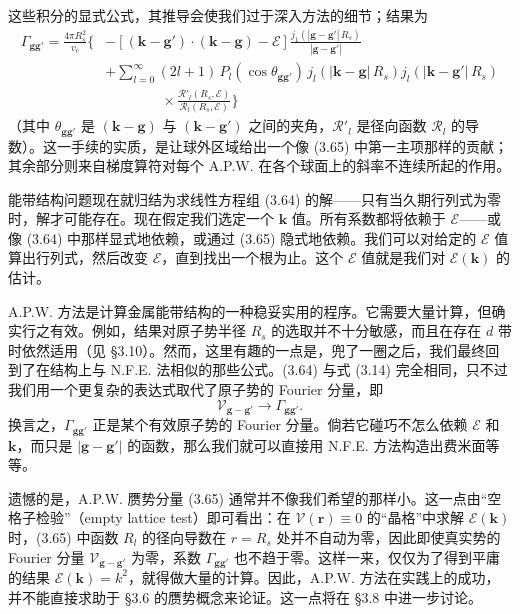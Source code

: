 这些积分的显式公式，其推导会使我们过于深入方法的细节；结果为
\begin{align*}
\Gamma_{\mathbf{gg}'}=\frac{4\pi R_s^2}{v_c}\Big\{&-\left[(\mathbf{k}-\mathbf{g}')\cdot(\mathbf{k}-\mathbf{g})-\mathcal{E}\right]\frac{j_1\left(|\mathbf{g}-\mathbf{g}'|\,R_s\right)}{|\mathbf{g}-\mathbf{g}'|}\\
&+\sum_{l=0}^{\infty}(2l+1)\,P_l(\cos\theta_{\mathbf{gg}'})\,j_l\left(|\mathbf{k}-\mathbf{g}|\,R_s\right)j_l\left(|\mathbf{k}-\mathbf{g}'|\,R_s\right)\\
&\qquad\qquad\times\frac{\mathcal{R}'_l(R_s,\mathcal{E})}{\mathcal{R}_l(R_s,\mathcal{E})}\Big\}\tag{3.65}
\end{align*}
（其中 $\theta_{\mathbf{gg}'}$ 是 $(\mathbf{k}-\mathbf{g})$ 与 $(\mathbf{k}-\mathbf{g}')$ 之间的夹角，$\mathcal{R}'_l$ 是径向函数 $\mathcal{R}_l$ 的导数）。这一手续的实质，是让球外区域给出一个像 (3.65) 中第一主项那样的贡献；其余部分则来自梯度算符对每个 A.P.W. 在各个球面上的斜率不连续所起的作用。

能带结构问题现在就归结为求线性方程组 (3.64) 的解——只有当久期行列式为零时，解才可能存在。现在假定我们选定一个 $\mathbf{k}$ 值。所有系数都将依赖于 $\mathcal{E}$——或像 (3.64) 中那样显式地依赖，或通过 (3.65) 隐式地依赖。我们可以对给定的 $\mathcal{E}$ 值算出行列式，然后改变 $\mathcal{E}$，直到找出一个根为止。这个 $\mathcal{E}$ 值就是我们对 $\mathcal{E}(\mathbf{k})$ 的估计。

A.P.W. 方法是计算金属能带结构的一种稳妥实用的程序。它需要大量计算，但确实行之有效。例如，结果对原子势半径 $R_s$ 的选取并不十分敏感，而且在存在 $d$ 带时依然适用（见 §3.10）。然而，这里有趣的一点是，兜了一圈之后，我们最终回到了在结构上与 N.F.E. 法相似的那些公式。(3.64) 与式 (3.14) 完全相同，只不过我们用一个更复杂的表达式取代了原子势的 Fourier 分量，即
\begin{equation*}
\mathcal{V}_{\mathbf{g}-\mathbf{g}'}\rightarrow\Gamma_{\mathbf{gg}'}.
\end{equation*}
换言之，$\Gamma_{\mathbf{gg}'}$ 正是某个有效原子势的 Fourier 分量。倘若它碰巧不怎么依赖 $\mathcal{E}$ 和 $\mathbf{k}$，而只是 $|\mathbf{g}-\mathbf{g}'|$ 的函数，那么我们就可以直接用 N.F.E. 方法构造出费米面等等。

遗憾的是，A.P.W. 赝势分量 (3.65) 通常并不像我们希望的那样小。这一点由“空格子检验”（empty lattice test）即可看出：在 $\mathcal{V}(\mathbf{r})\equiv 0$ 的“晶格”中求解 $\mathcal{E}(\mathbf{k})$ 时，(3.65) 中函数 $R_l$ 的径向导数在 $r=R_s$ 处并不自动为零，因此即使真实势的 Fourier 分量 $\mathcal{V}_{\mathbf{g}-\mathbf{g}'}$ 为零，系数 $\Gamma_{\mathbf{gg}'}$ 也不趋于零。这样一来，仅仅为了得到平庸的结果 $\mathcal{E}(\mathbf{k})=k^2$，就得做大量的计算。因此，A.P.W. 方法在实践上的成功，并不能直接求助于 §3.6 的赝势概念来论证。这一点将在 §3.8 中进一步讨论。

